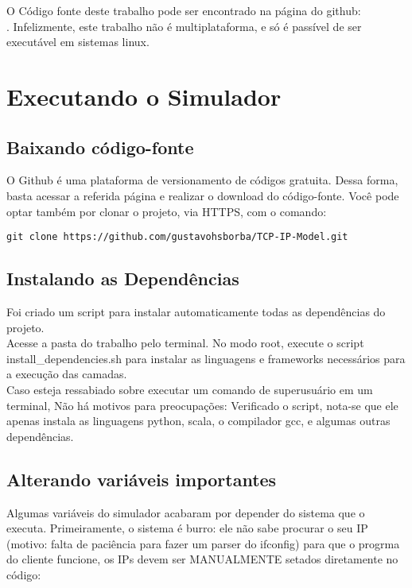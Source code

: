 \documentclass[11pt]{article}
\begin{document}
    O Código fonte deste trabalho pode ser encontrado na página do github: \\ [https:\/\/github.com\/gustavohsborba\/TCP-IP-Model]. Infelizmente, este trabalho não é multiplataforma, e só é passível de ser executável em sistemas linux.
	
\section{Executando o Simulador}

	\subsection{Baixando código-fonte}

        O Github é uma plataforma de versionamento de códigos gratuita. Dessa forma, basta acessar a referida página e realizar o download do código-fonte. Você pode optar também por clonar o projeto, via HTTPS, com o comando:
        
\begin{lstlisting}
git clone https://github.com/gustavohsborba/TCP-IP-Model.git
\end{lstlisting} 
		
	\subsection{Instalando as Dependências}
	
	    Foi criado um script para instalar automaticamente todas as dependências do projeto. \\
	    Acesse a pasta do trabalho pelo terminal. No modo root, execute o script install\_dependencies.sh para instalar as linguagens e frameworks necessários para a execução das camadas. \\
	    Caso esteja ressabiado sobre executar um comando de superusuário em um terminal, Não há motivos para preocupações: Verificado o script, nota-se que ele apenas instala as linguagens python, scala, o compilador gcc, e algumas outras dependências. 
	
	\subsection{Alterando variáveis importantes}
    
        Algumas variáveis do simulador acabaram por depender do sistema que o executa. Primeiramente, o sistema é burro: ele não sabe procurar o seu IP (motivo: falta de paciência para fazer um parser do ifconfig) para que o progrma do cliente funcione, os IPs devem ser MANUALMENTE setados diretamente no código:
        
\end{document}
